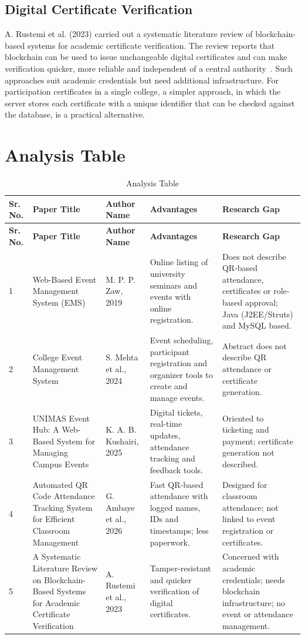 \documentclass[12pt,a4paper]{report}
\begin{document}
\subsection{Digital Certificate Verification}
A. Rustemi et al. (2023) carried out a systematic literature review of blockchain-based systems for academic certificate verification. The review reports that blockchain can be used to issue unchangeable digital certificates and can make verification quicker, more reliable and independent of a central authority~\cite{rustemi}. Such approaches suit academic credentials but need additional infrastructure. For participation certificates in a single college, a simpler approach, in which the server stores each certificate with a unique identifier that can be checked against the database, is a practical alternative.

\section{Analysis Table}
\begin{longtable}{|p{0.7cm}|p{3.4cm}|p{2.6cm}|p{3.3cm}|p{3.3cm}|}
\caption{Analysis Table}\label{tab:analysis}\\
\hline \textbf{Sr. No.} & \textbf{Paper Title} & \textbf{Author Name} & \textbf{Advantages} & \textbf{Research Gap}\\ \hline
\endfirsthead
\hline \textbf{Sr. No.} & \textbf{Paper Title} & \textbf{Author Name} & \textbf{Advantages} & \textbf{Research Gap}\\ \hline
\endhead
1 & Web-Based Event Management System (EMS) & M. P. P. Zaw, 2019 & Online listing of university seminars and events with online registration. & Does not describe QR-based attendance, certificates or role-based approval; Java (J2EE/Struts) and MySQL based.\\ \hline
2 & College Event Management System & S. Mehta et al., 2024 & Event scheduling, participant registration and organizer tools to create and manage events. & Abstract does not describe QR attendance or certificate generation.\\ \hline
3 & UNIMAS Event Hub: A Web-Based System for Managing Campus Events & K. A. B. Kushairi, 2025 & Digital tickets, real-time updates, attendance tracking and feedback tools. & Oriented to ticketing and payment; certificate generation not described.\\ \hline
4 & Automated QR Code Attendance Tracking System for Efficient Classroom Management & G. Ambaye et al., 2026 & Fast QR-based attendance with logged names, IDs and timestamps; less paperwork. & Designed for classroom attendance; not linked to event registration or certificates.\\ \hline
5 & A Systematic Literature Review on Blockchain-Based Systems for Academic Certificate Verification & A. Rustemi et al., 2023 & Tamper-resistant and quicker verification of digital certificates. & Concerned with academic credentials; needs blockchain infrastructure; no event or attendance management.\\ \hline
\end{longtable}
\end{document}
